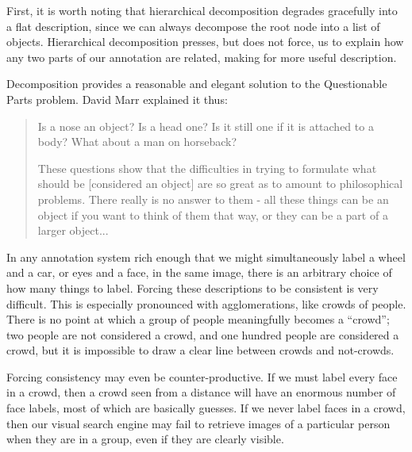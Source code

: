 \documentclass{article}
\begin{document}
First, it is worth noting that hierarchical decomposition degrades
gracefully into a flat description, since we can always decompose the
root node into a list of objects. Hierarchical decomposition presses,
but does not force, us to explain how any two parts of our annotation
are related, making for more useful description.

\bitem

\item Decomposition provides a reasonable and elegant solution to the
  Questionable Parts problem. David Marr explained it thus:
  \begin{quote}



    Is a nose an object? Is a head one?  Is it still one if it is
    attached to a body?  What about a man on horseback?

    These questions show that the difficulties in trying to formulate
    what should be [considered an object] %
    are so great as to amount to philosophical problems.  There really
    is no answer to them - all these things can be an object if you
    want to think of them that way, or they can be a part of a larger
    object...%
    \cite{marr}
  \end{quote}

  In any annotation system rich enough that we might simultaneously
  label a wheel and a car, or eyes and a face, in the same image,
  there is an arbitrary choice of how many things to label. Forcing
  these descriptions to be consistent is very
  difficult. \cite{labelme} This is especially pronounced with
  agglomerations, like crowds of people. There is no point at which a
  group of people meaningfully becomes a ``crowd''; two people are not
  considered a crowd, and one hundred people are considered a crowd,
  but it is impossible to draw a clear line between crowds and
  not-crowds.

Forcing consistency may even be counter-productive. If we must label
every face in a crowd, then a crowd seen from a distance will have an
enormous number of face labels, most of which are basically
guesses. If we never label faces in a crowd, then our visual search
engine may fail to retrieve images of a particular person when they
are in a group, even if they are clearly visible. 
  
\end{document}
